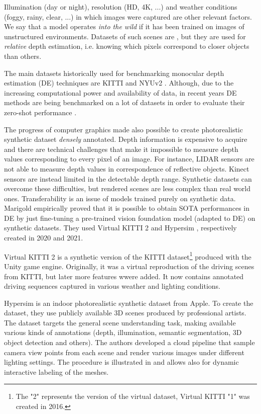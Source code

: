 Illumination (day or night), resolution (HD, 4K, ...) and weather conditions (foggy, rainy, clear, ...) in which images were captured are other relevant factors.
We say that a model operates \textit{into the wild} if it has been trained on images of unstructured environments.
Datasets of such scenes are \cite{DIW} \cite{ReDWeb} \cite{Youtube3D}, but they are used for \textit{relative} depth estimation, i.e. knowing which pixels correspond to closer objects than others.

The main datasets historically used for benchmarking monocular depth estimation (DE) techniques are KITTI \cite{KITTI} and NYUv2 \cite{NYUv2}.
Although, due to the increasing computational power and availability of data, in recent years DE methods are being benchmarked on a lot of datasets in order to evaluate their zero-shot performance \cite{MiDas, PatchFusion, Marigold, ZoeDepth}.

The progress of computer graphics made also possible to create photorealistic synthetic dataset \textit{densely} annotated.
Depth information is expensive to acquire and there are technical challenges that make it impossible to measure depth values corresponding to every pixel of an image.
For instance, LIDAR sensors are not able to measure depth values in correspondence of reflective objects.
Kinect sensors are instead limited in the detectable depth range.
Synthetic datasets can overcome these difficulties, but rendered scenes are less complex than real world ones.
Transferability is an issue of models trained purely on synthetic data.
Marigold \cite{Marigold} empirically proved that it is possible to obtain SOTA performances in DE by just fine-tuning a pre-trained vision foundation model (adapted to DE) on synthetic datasets.
They used Virtual KITTI 2 \cite{VirtualKITTI2} and Hypersim \cite{Hypersim}, respectively created in 2020 and 2021.

Virtual KITTI 2 \cite{VirtualKITTI2} is a synthetic version of the KITTI dataset\footnote{The "2" represents the version of the virtual dataset, Virtual KITTI "1" was created in 2016.} produced with the Unity game engine.
Originally, it was a virtual reproduction of the driving scenes from KITTI, but later more features wwere added.
It now contains annotated driving sequences captured in various weather and lighting conditions.

Hypersim \cite{Hypersim} is an indoor photorealistic synthetic dataset from Apple.
To create the dataset, they use publicly available 3D scenes produced by professional artists.
The dataset targets the general scene understanding task, making available various kinds of annotations (depth, illumination, semantic segmentation, 3D object detection and others).
The authors developed a cloud pipeline that sample camera view points from each scene and render various images under different lighting settings.
The procedure is illustrated in \cite{Hypersim} and allows also for dynamic interactive labeling of the meshes.

